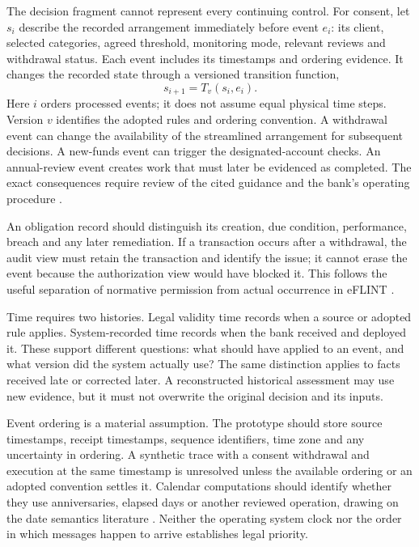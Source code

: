 \documentclass[12pt,a4paper,oneside,openany]{book}
\begin{document}
The decision fragment cannot represent every continuing control. For consent,
let $s_i$ describe the recorded arrangement immediately before event $e_i$:
its client, selected categories, agreed threshold, monitoring mode, relevant
reviews and withdrawal status. Each event includes its timestamps and ordering
evidence. It changes the recorded state through a
versioned transition function,
\begin{equation}
 s_{i+1}=T_v(s_i,e_i).
 \label{eq:transition}
\end{equation}
Here $i$ orders processed events; it does not assume equal physical time
steps. Version $v$ identifies the adopted rules and ordering convention. A
withdrawal event can change the availability of the streamlined arrangement for
subsequent decisions. A new-funds event can trigger the designated-account
checks. An annual-review event creates work that must later be evidenced as
completed. The exact consequences require review of the cited guidance and the
bank's operating procedure \citep{sfcspiannex1,sfcspiannex2}.

An obligation record should distinguish its creation, due condition, performance,
breach and any later remediation. If a transaction occurs after a withdrawal, the
audit view must retain the transaction and identify the issue; it cannot erase
the event because the authorization view would have blocked it. This follows the
useful separation of normative permission from actual occurrence in eFLINT
\citep{eflint2026}.

Time requires two histories. Legal validity time records when a source or adopted
rule applies. System-recorded time records when the bank received and deployed
it. These support different questions: what should have applied to an event, and
what version did the system actually use? The same distinction applies to facts
received late or corrected later. A reconstructed historical assessment may use
new evidence, but it must not overwrite the original decision and its inputs.

Event ordering is a material assumption. The prototype should store source
timestamps, receipt timestamps, sequence identifiers, time zone and any uncertainty
in ordering. A synthetic trace with a consent withdrawal and execution at the
same timestamp is unresolved unless the available ordering or an adopted
convention settles it. Calendar computations should identify whether they use
anniversaries, elapsed days or another reviewed operation, drawing on the date
semantics literature \citep{dates2024}. Neither the operating system clock nor the
order in which messages happen to arrive establishes legal priority.
\end{document}
